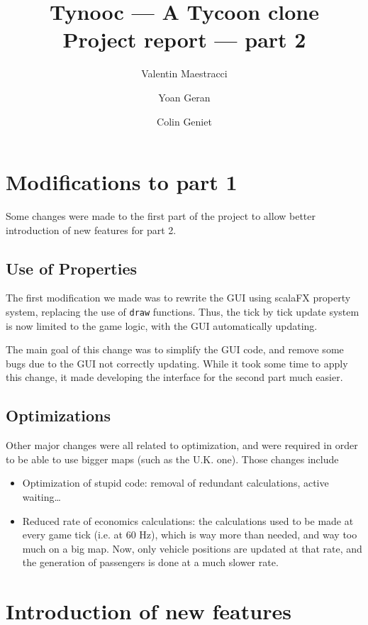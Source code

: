 \documentclass{article}
\begin{document}
\title{Tynooc --- A Tycoon clone \\ \large{Project report --- part 2}}
\author{Valentin Maestracci \and Yoan Geran \and Colin Geniet}
\maketitle

\tableofcontents

\section{Modifications to part 1}
Some changes were made to the first part of the project to allow better introduction of new features for part 2.

\subsection{Use of Properties}
The first modification we made was to rewrite the GUI using scalaFX property system,
replacing the use of \verb|draw| functions.
Thus, the tick by tick update system is now limited to the game logic, with the GUI automatically updating.

The main goal of this change was to simplify the GUI code, and remove some bugs due to the GUI
not correctly updating. While it took some time to apply this change, it made developing the interface
for the second part much easier.

\subsection{Optimizations}
Other major changes were all related to optimization, and were required in order to be able to use
bigger maps (such as the U.K. one). Those changes include
\begin{itemize}
\item Optimization of stupid code: removal of redundant calculations, active waiting\dots
\item Reduced rate of economics calculations: the calculations used to be made at every game tick (i.e. at 60 Hz),
which is way more than needed, and way too much on a big map.
Now, only vehicle positions are updated at that rate, and the generation of passengers is done at a much slower rate.
\end{itemize}


\section{Introduction of new features}
\end{document}
